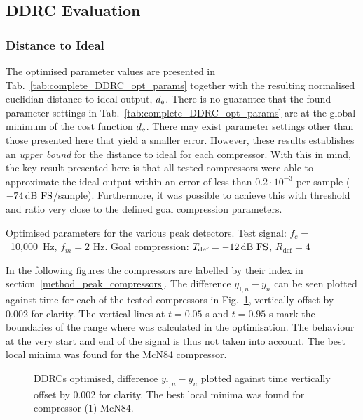 \documentclass[../main2.tex]{subfiles}
\providecommand{\rootdir}{..}
\begin{document}
\subsection{DDRC Evaluation}

\subsubsection{Distance to Ideal}
The optimised parameter values are presented in Tab.~\ref{tab:complete_DDRC_opt_params} together with the resulting normalised euclidian distance to ideal output, $d_\text{e}$. There is no guarantee that the found parameter settings in Tab.~\ref{tab:complete_DDRC_opt_params} are at the global minimum of the cost function $d_\text{e}$. There may exist parameter settings other than those presented here that yield a smaller error. However, these results establishes an \emph{upper bound} for the distance to ideal for each compressor. With this in mind, the key result presented here is that all tested compressors were able to approximate the ideal output within an error of less than $0.2\cdot 10^{-3}$ per sample ($-74 \mskip3mu\text{dB~FS}$/sample). Furthermore, it was possible to achieve this with threshold and ratio very close to the defined goal compression parameters.

\begin{table}[h]
\small
\begin{center}
\caption{Optimised parameters for the various peak detectors. Test signal: $f_c=$~10,000~Hz, $f_m=2$ Hz. Goal compression: $T_\text{def}=-12 \mskip3mu\text{dB~FS}$, $R_\text{def}=4$}
\label{tab:complete_DDRC_opt_params}

\end{center}
\end{table}

In the following figures the compressors are labelled by their index in section~\ref{method_peak_compressors}. The difference $y_{\text{I},n} - y_n$ can be seen plotted against time for each of the tested compressors in Fig.~\ref{fig:complete_DDRC_opt_diff}, vertically offset by 0.002 for clarity. The vertical lines at $t=0.05$ s and $t=0.95$ s mark the boundaries of the range where \EN was calculated in the optimisation. The behaviour at the very start and end of the signal is thus not taken into account. The best local minima was found for the McN84 compressor.

\begin{figure}[h]
\centerline{}
\caption{DDRCs optimised, difference $y_{\text{I},n} - y_n$ plotted against time vertically offset by 0.002 for clarity. The best local minima was found for compressor (1) McN84.}
\label{fig:complete_DDRC_opt_diff}
\end{figure}
\end{document}
